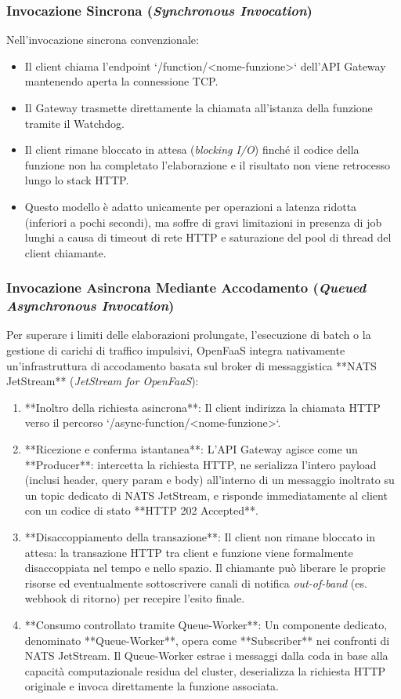 \documentclass[11pt, a4paper]{article}
\begin{document}
\subsubsection{Invocazione Sincrona (\emph{Synchronous Invocation})}
Nell'invocazione sincrona convenzionale:
\begin{itemize}[noitemsep]
    \item Il client chiama l'endpoint `/function/<nome-funzione>` dell'API Gateway mantenendo aperta la connessione TCP.
    \item Il Gateway trasmette direttamente la chiamata all'istanza della funzione tramite il Watchdog.
    \item Il client rimane bloccato in attesa (\emph{blocking I/O}) finché il codice della funzione non ha completato l'elaborazione e il risultato non viene retrocesso lungo lo stack HTTP.
    \item Questo modello è adatto unicamente per operazioni a latenza ridotta (inferiori a pochi secondi), ma soffre di gravi limitazioni in presenza di job lunghi a causa di timeout di rete HTTP e saturazione del pool di thread del client chiamante.
\end{itemize}

\subsubsection{Invocazione Asincrona Mediante Accodamento (\emph{Queued Asynchronous Invocation})}
Per superare i limiti delle elaborazioni prolungate, l'esecuzione di batch o la gestione di carichi di traffico impulsivi, OpenFaaS integra nativamente un'infrastruttura di accodamento basata sul broker di messaggistica **NATS JetStream** (\emph{JetStream for OpenFaaS}):
\begin{enumerate}
    \item **Inoltro della richiesta asincrona**: Il client indirizza la chiamata HTTP verso il percorso `/async-function/<nome-funzione>`.
    \item **Ricezione e conferma istantanea**: L'API Gateway agisce come un **Producer**: intercetta la richiesta HTTP, ne serializza l'intero payload (inclusi header, query param e body) all'interno di un messaggio inoltrato su un topic dedicato di NATS JetStream, e risponde immediatamente al client con un codice di stato **HTTP 202 Accepted**.
    \item **Disaccoppiamento della transazione**: Il client non rimane bloccato in attesa: la transazione HTTP tra client e funzione viene formalmente disaccoppiata nel tempo e nello spazio. Il chiamante può liberare le proprie risorse ed eventualmente sottoscrivere canali di notifica \emph{out-of-band} (es. webhook di ritorno) per recepire l'esito finale.
    \item **Consumo controllato tramite Queue-Worker**: Un componente dedicato, denominato **Queue-Worker**, opera come **Subscriber** nei confronti di NATS JetStream. Il Queue-Worker estrae i messaggi dalla coda in base alla capacità computazionale residua del cluster, deserializza la richiesta HTTP originale e invoca direttamente la funzione associata.
\end{enumerate}
\end{document}

